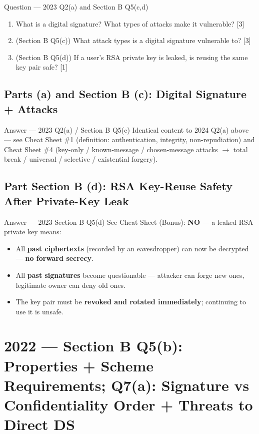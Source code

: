 \documentclass[12pt,a4paper]{article}
\begin{document}
\begin{qbox}{Question --- 2023 Q2(a) and Section B Q5(c,d)}
\begin{enumerate}[label=(\alph*)]
  \item What is a digital signature? What types of attacks make it vulnerable? \hfill [3]
  \item (Section B Q5(c)) What attack types is a digital signature vulnerable to? \hfill [3]
  \item (Section B Q5(d)) If a user's RSA private key is leaked, is reusing the same key pair safe? \hfill [1]
\end{enumerate}
\end{qbox}

\subsection{Parts (a) and Section B (c): Digital Signature + Attacks}
\begin{solbox}{Answer --- 2023 Q2(a) / Section B Q5(c)}
Identical content to 2024 Q2(a) above --- see Cheat Sheet \#1 (definition: authentication, integrity, non-repudiation) and Cheat Sheet \#4 (key-only / known-message / chosen-message attacks $\to$ total break / universal / selective / existential forgery).
\end{solbox}

\subsection{Part Section B (d): RSA Key-Reuse Safety After Private-Key Leak}
\begin{solbox}{Answer --- 2023 Section B Q5(d)}
See Cheat Sheet (Bonus): \textbf{NO} --- a leaked RSA private key means:
\begin{itemize}[noitemsep]
  \item All \textbf{past ciphertexts} (recorded by an eavesdropper) can now be decrypted --- \textbf{no forward secrecy}.
  \item All \textbf{past signatures} become questionable --- attacker can forge new ones, legitimate owner can deny old ones.
  \item The key pair must be \textbf{revoked and rotated immediately}; continuing to use it is unsafe.
\end{itemize}
\end{solbox}

\newpage
\section{2022 --- Section B Q5(b): Properties + Scheme Requirements; Q7(a): Signature vs Confidentiality Order + Threats to Direct DS}
\end{document}

